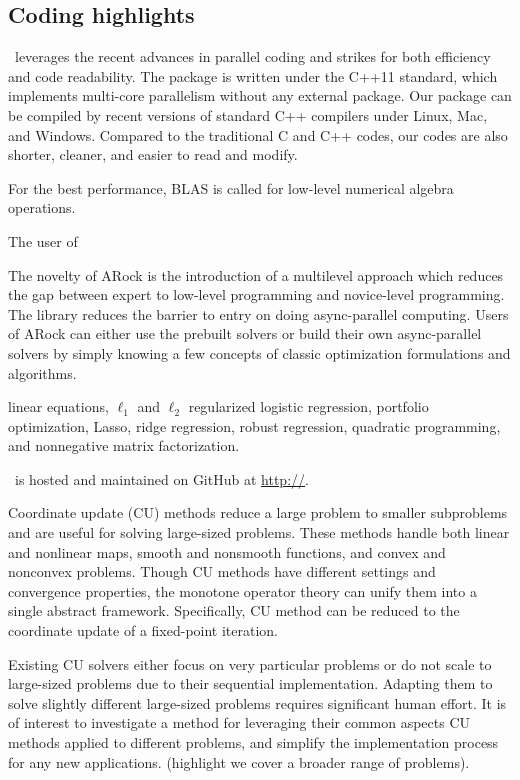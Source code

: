\subsection{Coding highlights}
\pkg~leverages the recent advances in parallel coding and strikes for both efficiency and code readability. The package is written under the C++11 standard, which implements multi-core parallelism without any external package. Our package can be compiled by  recent versions of standard C++ compilers  under Linux, Mac, and Windows. Compared to the traditional C and C++ codes, our codes  are also shorter, cleaner, and easier to read and modify. 

For the best performance, BLAS is called for low-level numerical algebra operations.

The user of 

The novelty of ARock is the introduction of a multilevel approach which reduces the gap between expert to low-level programming and novice-level programming.
The library reduces the barrier to entry on doing async-parallel computing. 
Users of ARock can either use the prebuilt solvers or build their own async-parallel solvers by simply knowing a few concepts of classic optimization formulations and algorithms.
 


linear equations, $\ell_1$ and $\ell_2$ regularized logistic regression, portfolio optimization, 
Lasso, ridge regression, robust regression, quadratic programming, and nonnegative matrix factorization.

\pkg~is hosted and maintained on GitHub at \url{http://}. 



Coordinate update (CU) methods reduce a large problem to smaller subproblems and are useful for solving large-sized problems.
These methods handle both linear and nonlinear maps, smooth and nonsmooth functions, and convex and nonconvex problems. 
Though CU methods have different settings and convergence properties,  the monotone operator theory can unify them into a single abstract framework. 
Specifically, CU method can be reduced to the coordinate update of a fixed-point iteration. 


Existing CU solvers \citep{hsieh2015passcode,jaggi2014communication,recht2011hogwild} either focus on very particular problems or do not scale to large-sized problems due to their sequential implementation. 
Adapting them to solve slightly different large-sized problems requires significant human effort. 
It is of interest to investigate a method for leveraging their common aspects CU methods applied to different problems, and simplify the implementation process for any new applications. (highlight we cover a broader range of problems).

